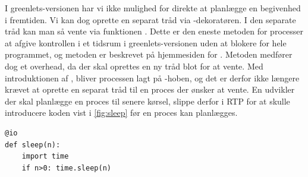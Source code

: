 I greenlets-versionen har vi ikke mulighed for direkte at planlægge en begivenhed i fremtiden. Vi kan dog oprette en separat tråd  via -dekoratøren. I den separate tråd kan man så vente via funktionen . Dette er den eneste metoden for processer at afgive kontrollen i et tidsrum i greenlets-versionen uden at blokere for hele programmet, og metoden er beskrevet på  hjemmesiden for \pycsp. Metoden medfører dog et overhead, da der skal oprettes en ny tråd blot for at vente.  Med introduktionen af , bliver processen lagt på -hoben, og det er derfor ikke længere krævet at oprette en separat tråd til en proces der ønsker at vente. En udvikler der skal planlægge en proces til senere kørsel, slippe derfor i RTP for at skulle introducere koden vist i \cref{fig:sleep} før en proces kan planlægges.

\begin{lstlisting}[firstnumber=1 ,float=hbtp, label=fig:sleep, caption=Funktion der venter et antal sekunder]
@io
def sleep(n):
    import time
    if n>0: time.sleep(n)
\end{lstlisting}
 

